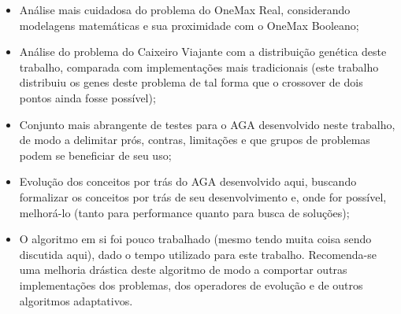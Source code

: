 \begin{itemize}

	\item Análise mais cuidadosa do problema do OneMax Real, considerando modelagens matemáticas e sua proximidade com o OneMax Booleano;

	\item Análise do problema do Caixeiro Viajante com a distribuição genética deste trabalho, comparada com implementações mais tradicionais (este trabalho distribuiu os genes deste problema de tal forma que o crossover de dois pontos ainda fosse possível);

	\item Conjunto mais abrangente de testes para o AGA desenvolvido neste trabalho, de modo a delimitar prós, contras, limitações e que grupos de problemas podem se beneficiar de seu uso;

	\item Evolução dos conceitos por trás do AGA desenvolvido aqui, buscando formalizar os conceitos por trás de seu desenvolvimento e, onde for possível, melhorá-lo (tanto para performance quanto para busca de soluções);

	\item O algoritmo em si foi pouco trabalhado (mesmo tendo muita coisa sendo discutida aqui), dado o tempo utilizado para este trabalho. Recomenda-se uma melhoria drástica deste algoritmo de modo a comportar outras implementações dos problemas, dos operadores de evolução e de outros algoritmos adaptativos.

\end{itemize}
